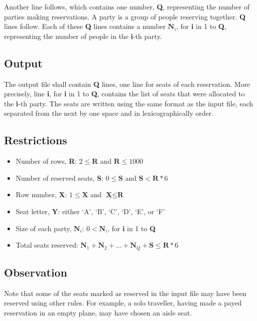 \documentclass[11pt]{report}
\begin{document}
Another line follows, which contains one number, \textbf{Q}, representing the
number of parties making reservations. A party is a group of people reserving
together. \textbf{Q} lines follow. Each of these \textbf{Q} lines contains a
number $\mathbf{N}_i$, for \textbf{i} in 1 to \textbf{Q}, representing the
number of people in the \textbf{i}-th party.

\subsection*{Output}

The output file shall contain \textbf{Q} lines, one line for seats of each reservation.
More precisely, line \textbf{i}, for \textbf{i} in 1 to \textbf{Q}, contains the
list of seats that were allocated to the \textbf{i}-th party. The seats are
written using the same format as the input file, each separated from the next by
one space and in lexicographically order.

\subsection*{Restrictions}

\begin{itemize}
\item Number of rows, \textbf{R}: $2 \leq \textbf{R}$ and $\textbf{R} \leq 1000$
\item Number of reserved seats, \textbf{S}: $0 \leq \textbf{S}$ and $\textbf{S} < \textbf{R} * 6$
\item Row number, \textbf{X}: $1 \leq \textbf{X}$ and $\textbf{X} \leq \textbf{R}$
\item Seat letter, \textbf{Y}: either ‘A’, ‘B’, ‘C’, ‘D’, ‘E’, or ‘F’
\item Size of each party, $\mathbf{N}_i$: $0 < \mathbf{N}_i$, for \textbf{i} in 1 to \textbf{Q}
\item Total seats reserved: $\mathbf{N}_1 + \mathbf{N}_2 + … +
  \mathbf{N}_Q + \textbf{S} \leq \textbf{R} * 6$
\end{itemize}

\subsection*{Observation}

Note that some of the seats marked as reserved in the input file may have been
reserved using other rules. For example, a solo traveller, having made a payed
reservation in an empty plane, may have chosen an aisle seat.
\end{document}
